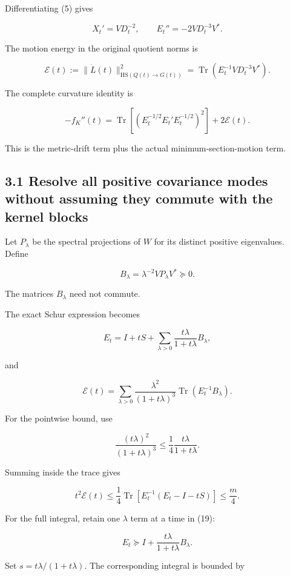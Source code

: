 \documentclass[11pt]{article}
\begin{document}
Differentiating (5) gives

\[
X_t'=VD_t^{-2},
\qquad
E_t''=-2VD_t^{-3}V^*.
\]

The motion energy in the original quotient norms is

\[
\boxed{
\mathcal E(t)
:=
\|\dot L(t)\|_{\mathrm{HS}(Q(t)\to G(t))}^{2}
=
\operatorname{Tr}(E_t^{-1}VD_t^{-3}V^*).
}
\tag{17}
\]

The complete curvature identity is

\[
\boxed{
-f_K''(t)
=
\operatorname{Tr}
\left[(E_t^{-1/2}E_t'E_t^{-1/2})^2\right]
+2\mathcal E(t).
}
\tag{18}
\]

This is the metric-drift term plus the actual minimum-section-motion term.

\subsection{3.1 Resolve all positive covariance modes without assuming they commute with the kernel blocks}\label{resolve-all-positive-covariance-modes-without-assuming-they-commute-with-the-kernel-blocks}

Let \(P_\lambda\) be the spectral projections of \(W\) for its distinct positive eigenvalues. Define

\[
B_\lambda=\lambda^{-2}VP_\lambda V^*\succeq0.
\]

The matrices \(B_\lambda\) need not commute.

The exact Schur expression becomes

\[
\boxed{
E_t=I+tS+
\sum_{\lambda>0}\frac{t\lambda}{1+t\lambda}B_\lambda,
}
\tag{19}
\]

and

\[
\mathcal E(t)
=
\sum_{\lambda>0}
\frac{\lambda^2}{(1+t\lambda)^3}
\operatorname{Tr}(E_t^{-1}B_\lambda).
\tag{20}
\]

For the pointwise bound, use

\[
\frac{(t\lambda)^2}{(1+t\lambda)^3}
\le\frac14\frac{t\lambda}{1+t\lambda}.
\]

Summing inside the trace gives

\[
\boxed{
t^2\mathcal E(t)
\le
\frac14\operatorname{Tr}
\left[E_t^{-1}(E_t-I-tS)\right]
\le\frac m4.
}
\tag{21}
\]

For the full integral, retain one \(\lambda\) term at a time in (19):

\[
E_t\succeq I+\frac{t\lambda}{1+t\lambda}B_\lambda.
\]

Set \(s=t\lambda/(1+t\lambda)\). The corresponding integral is bounded by
\end{document}
